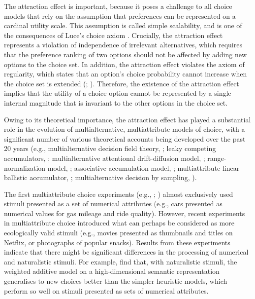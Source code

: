\documentclass[12pt, a4paper]{article}
\begin{document}
The attraction effect is important, because it poses a challenge to all choice models that rely on the assumption that preferences can be represented on a cardinal utility scale. This assumption is called simple scalability, and is one of the consequences of Luce's choice axiom \cite{Luce1959}. Crucially, the attraction effect represents a violation of independence of irrelevant alternatives, which requires that the preference ranking of two options should not be affected by adding new options to the choice set. In addition, the attraction effect violates the axiom of regularity, which states that an option's choice probability cannot increase when the choice set is extended (; ). Therefore, the existence of the attraction effect implies that the utility of a choice option cannot be represented by a single internal magnitude that is invariant to the other options in the choice set.

Owing to its theoretical importance, the attraction effect has played a substantial role in the evolution of multialternative, multiattribute models of choice, with a significant number of various theoretical accounts being developed over the past 20 years (e.g., multialternative decision field theory, ; leaky competing accumulators, ; multialternative attentional drift-diffusion model,   ; range-normalization model, ; associative accumulation model, ; multiattribute linear ballistic accumulator, ; multialternative decision by sampling, ).

The first multiattribute choice experiments (e.g., ; ) almost exclusively used stimuli presented as a set of numerical attributes (e.g., cars presented as numerical values for gas mileage and ride quality). However, recent experiments in multiattribute choice introduced what can perhaps be considered as more ecologically valid stimuli (e.g., movies presented as thumbnails and titles on Netflix, or photographs of popular snacks). Results from these experiments indicate that there might be significant differences in the processing of numerical and naturalistic stimuli. For example,  find that, with naturalistic stimuli, the weighted additive model on a high-dimensional semantic representation generalises to new choices better than the simpler heuristic models, which perform so well on stimuli presented as sets of numerical attributes.
\end{document}
